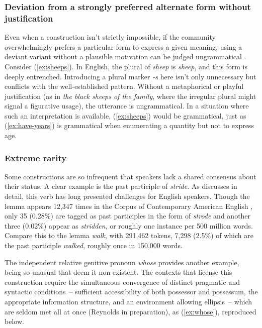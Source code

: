 \subsubsection{Deviation from a strongly preferred alternate form without justification}

Even when a construction isn't strictly impossible, if the community overwhelmingly prefers a particular form to express a given meaning, using a deviant variant without a plausible motivation can be judged ungrammatical \autocite{mayerthaler1988}. Consider (\ref{ex:sheeps}).
\label{ex:sheeps}
\z
In English, the plural of \textit{sheep} is \textit{sheep}, and this form is deeply entrenched. Introducing a plural marker \textit{-s} here isn't only unnecessary but conflicts with the well-established pattern. Without a metaphorical or playful justification (as in \textit{the black sheeps of the family}, where the irregular plural might signal a figurative usage), the utterance is ungrammatical. In a situation where such an interpretation is available, (\ref{ex:sheeps}) would be grammatical, just as (\ref{ex:have-years}) is grammatical when enumerating a quantity but not to express age.

\subsubsection{Extreme rarity}
Some constructions are so infrequent that speakers lack a shared consensus about their status. A clear example is the past participle of \textit{stride}.  As \textcite{woolf1980past} discusses in detail, this verb has long presented challenges for English speakers. Though the lemma appears 12,347 times in the Corpus of Contemporary American English \autocite{Davies2008COCA}, only 35 (0.28\%) are tagged as past participles in the form of \textit{strode} and another three (0.02\%) appear as \textit{stridden}, or roughly one instance per 500 million words. Compare this to the lemma \textit{walk}, with 291,462 tokens, 7,298 (2.5\%) of which are the past participle \textit{walked}, roughly once in 150,000 words. 

The independent relative genitive pronoun \textit{whose} provides another example, being so unusual that \textcite{hankamer1973whose} deem it non-existent. The contexts that license this construction require the simultaneous convergence of distinct pragmatic and syntactic conditions~-- sufficient accessibility of both possessor and possessum, the appropriate information structure, and an environment allowing ellipsis~-- which are seldom met all at once (Reynolds in preparation), as (\ref{ex:whose}), reproduced below.

